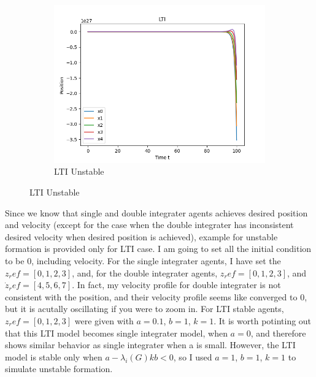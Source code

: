 \documentclass{article}
\begin{document}
\begin{problem}
\begin{figure}[!h]
\begin{subfigure}{0.4\textwidth}
            \includegraphics[width=\textwidth]{./img/p5_6.png}
            \caption{LTI Unstable}
        \end{subfigure}
    \end{figure}
    Since we know that single and double integrater agents achieves desired position and velocity (except for the case when the double integrater has inconsistent desired velocity when desired position is achieved), example for unstable formation is provided only for LTI case. I am going to set all the initial condition to be 0, including velocity.
    For the single integrater agents, I have set the $z_ref = [0, 1,2,3]$, and, for the double integrater agents, $z_ref = [0, 1,2,3]$, and $ \dot z_ref = [4,5,6,7]$. In fact, my velocity profile for double integrater is not consistent with the position, and their velocity profile seems like converged to 0, but it is acutally oscillating if you were to zoom in. For LTI stable agents, $z_ref = [0, 1,2,3]$ were given with $a = 0.1$, $b = 1$, $k = 1$. It is worth potinting out that this LTI model becomes single integrater model, when $a = 0$, and therefore shows similar behavior as single integrater when a is small. However, the LTI model is stable only when $a-\lambda_i(G) k b < 0$, so I used $a = 1$, $b = 1$, $k = 1$ to simulate unstable formation.
\end{problem}
\end{document}
